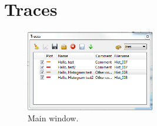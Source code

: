 \documentclass[11pt]{scrartcl}
\begin{document}
\section{Traces}
\begin{figure}[htbp]
\begin{center}
\includegraphics[width=0.5\textwidth]{Traces}
\end{center}
\caption{\label{AutoloadSettings} Main window.}
\end{figure}
\end{document}
